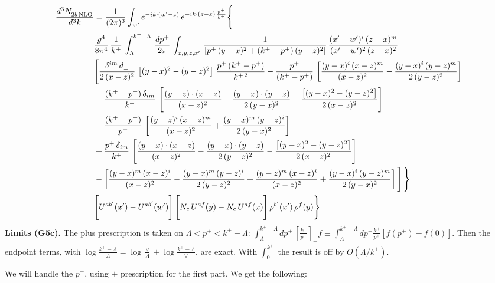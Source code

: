 \documentclass[9pt]{article}
\numberwithin{equation}{section}
\begin{document}
\begin{align}
 \frac{d^{3}N_{2b\,\rm NLO}^{\rm}}{d^{3}k}  & =   \frac{1}{(2\pi)^{3}}  \int_{ w^\prime} e^{-ik\cdot(w'-z)}\,e^{-ik\cdot (z-x)\,\frac{p^{+}}{k^{+}}} \Bigg\{\notag \\ & \frac{g^{4}}{8\pi^{4}}\,\frac{1}{k^{+}}\,\int_{\Lambda}^{k^{+}-\Lambda}\, \frac{dp^{+}}{2\pi} \, \int_{x,y,z,x'}\,\frac{1}{\left[p^{+}\,(y-x)^{2}+(k^{+}-p^{+})\,(y-z)^{2}\right]}\, \frac{(x'-w')^{i}\,(z-x)^{m}}{(x'-w')^{2}\,(z-x)^{2}} \notag \\ & \Bigg[\frac{\delta^{im}\,d_{\perp}}{2\,(x-z)^{2}}\,\left[(y-x)^{2}-(y-z)^{2}\right]\,\frac{p^{+}\,(k^{+}-p^{+})}{k^{+\,2}}-\frac{p^{+}}{(k^{+}-p^{+})}\,\left[\frac{(y-x)^{i}\,(x-z)^{m}}{(x-z)^{2}}-\frac{(y-x)^{i}\,(y-z)^{m}}{2\,(y-z)^{2}}\right]\notag \\ & +\frac{(k^{+}-p^{+})\,\delta_{im}}{k^{+}}\,\left[\frac{(y-z)\cdot (x-z)}{(x-z)^{2}}+\frac{(y-x)\cdot (y-z)}{2\,(y-x)^{2}}-\frac{\left[(y-x)^{2}-(y-z)^{2}\right]}{2\,(x-z)^{2}}\right]\notag \\ & -\frac{(k^{+}-p^{+})}{p^{+}}\,\left[\frac{(y-z)^{i}\,(x-z)^{m}}{(x-z)^{2}}+\frac{(y-x)^{m}\,(y-z)^{i}}{2\,(y-x)^{2}}\right]\notag \\ & +\frac{p^{+}\,\delta_{im}}{k^{+}}\,\left[\frac{(y-x)\cdot (x-z)}{(x-z)^{2}}-\frac{(y-x)\cdot (y-z)}{2\,(y-z)^{2}}-\frac{\left[(y-x)^{2}-(y-z)^{2}\right]}{2\,(x-z)^{2}}\right]\notag \\ &-\left[\frac{(y-x)^{m}\,(x-z)^{i}}{(x-z)^{2}}-\frac{(y-x)^{m}\,(y-z)^{i}}{2\,(y-z)^{2}}+\frac{(y-z)^{m}\,(x-z)^{i}}{(x-z)^{2}}+\frac{(y-x)^{i}\,(y-z)^{m}}{2\,(y-x)^{2}}\right]\Bigg]\,\Bigg\} \notag \\ & \Bigg[U^{ab'}(x')-U^{ab'}(w')\Bigg]\,\Bigg[N_{c}\,U^{af}(y) -N_{c}\,U^{af}(x)\Bigg]\,\rho^{b'}(x')\,\rho^{f}(y)\Bigg\}
\end{align}
\begingroup\color{blue}\noindent\textbf{Limits (G5c).} The plus prescription is taken on $\Lambda<p^{+}<k^{+}-\Lambda$: $\int_{\Lambda}^{k^{+}-\Lambda}dp^{+}\,[\frac{k^{+}}{p^{+}}]_{+}f\equiv\int_{\Lambda}^{k^{+}-\Lambda}dp^{+}\frac{k^{+}}{p^{+}}[f(p^{+})-f(0)]$. Then the endpoint terms, with $\log\frac{k^{+}-\Lambda}{\Lambda}=\log\frac{\vee}{\Lambda}+\log\frac{k^{+}-\Lambda}{\vee}$, are exact. With $\int_{0}^{k^{+}}$ the result is off by $O(\Lambda/k^{+})$.\par\endgroup
We will handle the $p^{+}$, using $+$ prescription for the first part. We get the following: 
\end{document}

